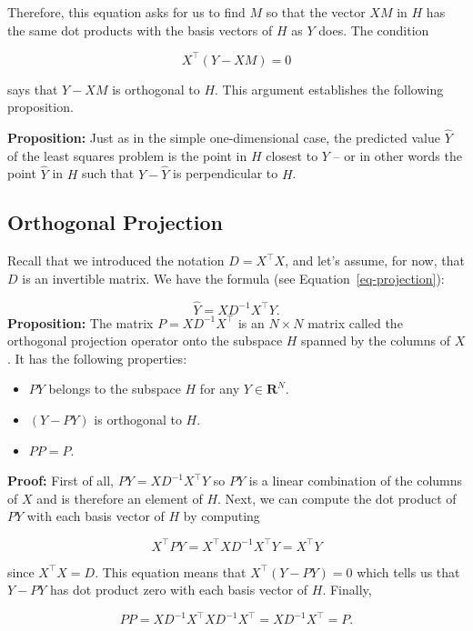 \documentclass[
  11pt,
  letterpaper,
]{scrbook}
\providecommand{\tightlist}{%
  \setlength{\itemsep}{0pt}\setlength{\parskip}{0pt}}\usepackage{longtable,booktabs,array}
\theoremstyle{plain}
\theoremstyle{remark}
\begin{document}
Therefore, this equation asks for us to find \(M\) so that the vector
\(XM\) in \(H\) has the same dot products with the basis vectors of
\(H\) as \(Y\) does. The condition

\[ X^{\intercal}(Y-XM)=0 \]

says that \(Y-XM\) is orthogonal to \(H\). This argument establishes the
following proposition.

\textbf{Proposition:} Just as in the simple one-dimensional case, the
predicted value \(\hat{Y}\) of the least squares problem is the point in
\(H\) closest to \(Y\) -- or in other words the point \(\hat{Y}\) in
\(H\) such that \(Y-\hat{Y}\) is perpendicular to \(H\).

\hypertarget{orthogonal-projection}{%
\subsection{Orthogonal Projection}\label{orthogonal-projection}}

Recall that we introduced the notation \(D=X^{\intercal}X\), and let's
assume, for now, that \(D\) is an invertible matrix. We have the formula
(see Equation~\ref{eq-projection}):

\[ \hat{Y} = XD^{-1}X^{\intercal}Y. \] \textbf{Proposition:} The matrix
\(P=XD^{-1}X^{\intercal}\) is an \(N\times N\) matrix called the
orthogonal projection operator onto the subspace \(H\) spanned by the
columns of \(X\). It has the following properties:

\begin{itemize}
\tightlist
\item
  \(PY\) belongs to the subspace \(H\) for any \(Y\in\mathbf{R}^{N}\).
\item
  \((Y-PY)\) is orthogonal to \(H\).
\item
  \(PP = P\).
\end{itemize}

\textbf{Proof:} First of all, \(PY=XD^{-1}X^{\intercal}Y\) so \(PY\) is
a linear combination of the columns of \(X\) and is therefore an element
of \(H\). Next, we can compute the dot product of \(PY\) with each basis
vector of \(H\) by computing

\[ X^{\intercal}PY = X^{\intercal}XD^{-1}X^{\intercal}Y =
X^{\intercal}Y
\]

since \(X^{\intercal}X=D\). This equation means that
\(X^{\intercal}(Y-PY)=0\) which tells us that \(Y-PY\) has dot product
zero with each basis vector of \(H\). Finally,

\[
PP = XD^{-1}X^{\intercal}XD^{-1}X^{\intercal} =
XD^{-1}X^{\intercal}=P.
\]
\end{document}
